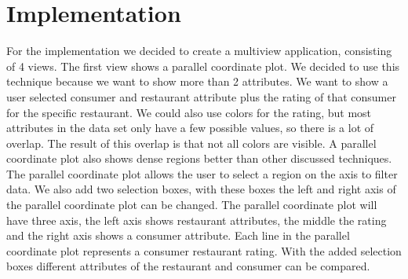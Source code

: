 \section{Implementation}\label{sec:implemenation}

For the implementation we decided to create a multiview application, consisting of 4 views.
The first view shows a parallel coordinate plot.
We decided to use this technique because we want to show more than 2 attributes.
We want to show a user selected consumer and restaurant attribute plus the rating of that consumer for the specific restaurant.
We could also use colors for the rating, but most attributes in the data set only have a few possible values, so there is a lot of overlap.
The result of this overlap is that not all colors are visible.
A parallel coordinate plot also shows dense regions better than other discussed techniques.
The parallel coordinate plot allows the user to select a region on the axis to filter data.
We also add two selection boxes, with these boxes the left and right axis of the parallel coordinate plot can be changed.
The parallel coordinate plot will have three axis, the left axis shows restaurant attributes, the middle the rating and the right axis shows a consumer attribute.
Each line in the parallel coordinate plot represents a consumer restaurant rating.
With the added selection boxes different attributes of the restaurant and consumer can be compared.


